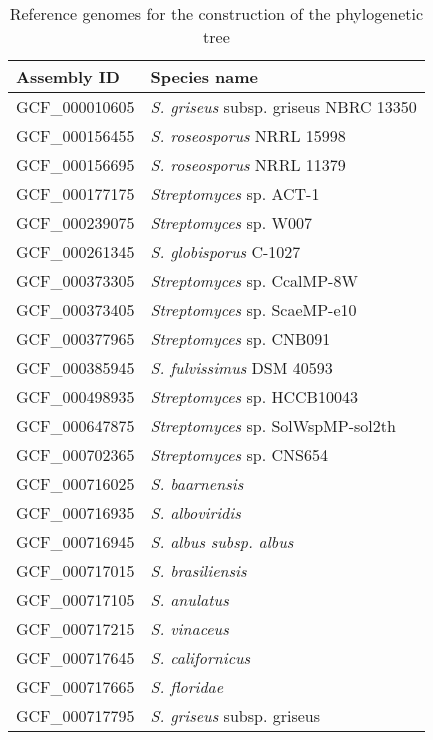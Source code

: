 \setlength{\asdf}{\textwidth} %
\addtolength{\asdf}{-8\tabcolsep} %
\begin{longtable}{p{0.5\asdf}p{0.5\asdf}}
\caption{Reference genomes for the construction of the phylogenetic tree}
\label{tab:ref_genomes} \\
	\toprule
	\textbf{Assembly ID} & \textbf{Species name}		\\
	\midrule
	GCF\_000010605 	&	\emph{S. griseus} subsp. griseus NBRC 13350	\\
	GCF\_000156455 	&	\emph{S. roseosporus} NRRL 15998	\\
	GCF\_000156695 	&	\emph{S. roseosporus} NRRL 11379	\\
	GCF\_000177175 	&	\emph{Streptomyces} sp. ACT-1	\\
	GCF\_000239075 	&	\emph{Streptomyces} sp. W007	\\
	GCF\_000261345 	&	\emph{S. globisporus} C-1027	\\
	GCF\_000373305 	&	\emph{Streptomyces} sp. CcalMP-8W	\\
	GCF\_000373405 	&	\emph{Streptomyces} sp. ScaeMP-e10	\\
	GCF\_000377965 	&	\emph{Streptomyces} sp. CNB091	\\
	GCF\_000385945 	&	\emph{S. fulvissimus} DSM 40593	\\
	GCF\_000498935 	&	\emph{Streptomyces} sp. HCCB10043	\\
	GCF\_000647875 	&	\emph{Streptomyces} sp. SolWspMP-sol2th	\\
	GCF\_000702365 	&	\emph{Streptomyces} sp. CNS654	\\
	GCF\_000716025 	&	\emph{S. baarnensis}	\\
	GCF\_000716935 	&	\emph{S. alboviridis}	\\
	GCF\_000716945 	&	\emph{S. albus subsp. albus}	\\
	GCF\_000717015 	&	\emph{S. brasiliensis}	\\
	GCF\_000717105 	&	\emph{S. anulatus}	\\
	GCF\_000717215 	&	\emph{S. vinaceus}	\\
	GCF\_000717645 	&	\emph{S. californicus}	\\
	GCF\_000717665 	&	\emph{S. floridae}	\\
	GCF\_000717795 	&	\emph{S. griseus} subsp. griseus	\\

\end{longtable}
